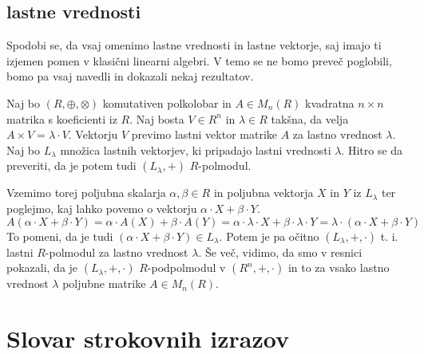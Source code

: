 \documentclass[mat1]{fmfdelo}
\begin{document}
\subsection{lastne vrednosti}
Spodobi se, da vsaj omenimo lastne vrednosti in lastne vektorje, saj imajo ti izjemen pomen v klasični linearni algebri. V temo se ne bomo preveč poglobili, bomo pa vsaj navedli in dokazali nekaj rezultatov.
\begin{definicija}
	Naj bo $(R, \oplus, \otimes)$ komutativen polkolobar in $A\in M_n(R)$ kvadratna $n\times n$ matrika s koeficienti iz $R$. Naj bosta $V\in R^n$ in $\lambda\in R$ takšna, da velja $A \times V = \lambda \cdot V$. Vektorju $V$ previmo lastni vektor matrike $A$ za lastno vrednost $\lambda$. Naj bo $L_\lambda$ množica lastnih vektorjev, ki pripadajo lastni vrednosti $\lambda$. Hitro se da preveriti, da je potem tudi $(L_\lambda, +)$ $R$-polmodul.
	
	Vzemimo torej poljubna skalarja $\alpha, \beta\in R$ in poljubna vektorja $X$ in $Y$ iz $L_\lambda$ ter poglejmo, kaj lahko povemo o vektorju $\alpha\cdot X + \beta\cdot Y$. $$A(\alpha\cdot X + \beta\cdot Y) = \alpha\cdot A(X) + \beta\cdot A(Y) = \alpha\cdot\lambda\cdot X + \beta\cdot\lambda\cdot Y = \lambda\cdot (\alpha\cdot X + \beta\cdot Y)$$ To pomeni, da je tudi $(\alpha\cdot X + \beta\cdot Y)\in L_\lambda$. Potem je pa očitno $(L_\lambda, +, \cdot)$ t. i. lastni $R$-polmodul za lastno vrednost $\lambda$. Še več, vidimo, da smo v resnici pokazali, da je $(L_\lambda, +, \cdot)$ $R$-podpolmodul v $(R^n, +, \cdot)$ in to za vsako lastno vrednost $\lambda$ poljubne matrike $A\in M_n(R)$.
\end{definicija}


\section*{Slovar strokovnih izrazov}

\end{document}
